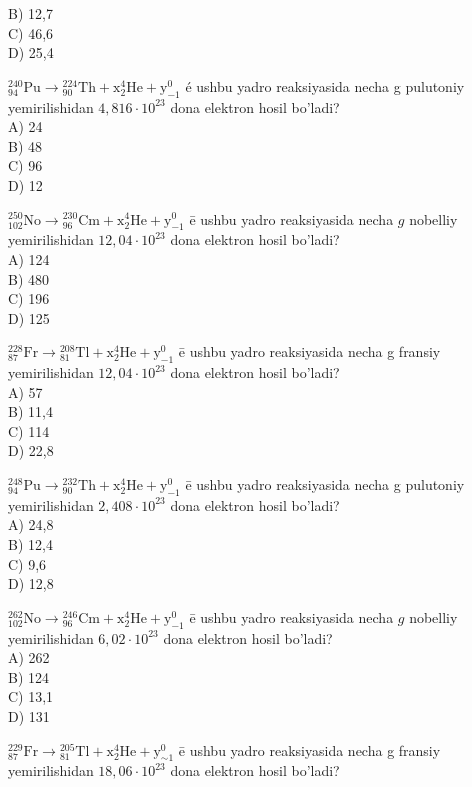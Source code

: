 B) 12,7\\
C) 46,6\\
D) 25,4
  \item ${ }_{94}^{240} \mathrm{Pu} \rightarrow{ }_{90}^{224} \mathrm{Th}+\mathrm{x}_{2}^{4} \mathrm{He}+\mathrm{y}_{-1}^{0}$ é ushbu yadro reaksiyasida necha g pulutoniy yemirilishidan $4,816 \cdot 10^{23}$ dona elektron hosil bo'ladi?\\
A) 24\\
B) 48\\
C) 96\\
D) 12
  \item ${ }_{102}^{250} \mathrm{No} \rightarrow{ }_{96}^{230} \mathrm{Cm}+\mathrm{x}_{2}^{4} \mathrm{He}+\mathrm{y}_{-1}^{0}$ ē ushbu yadro reaksiyasida necha $g$ nobelliy yemirilishidan $12,04 \cdot 10^{23}$ dona elektron hosil bo'ladi?\\
A) 124\\
B) 480\\
C) 196\\
D) 125
  \item ${ }_{87}^{228} \mathrm{Fr} \rightarrow{ }_{81}^{208} \mathrm{Tl}+\mathrm{x}_{2}^{4} \mathrm{He}+\mathrm{y}_{-1}^{0}$ ē ushbu yadro reaksiyasida necha g fransiy yemirilishidan $12,04 \cdot 10^{23}$ dona elektron hosil bo'ladi?\\
A) 57\\
B) 11,4\\
C) 114\\
D) 22,8
  \item ${ }_{94}^{248} \mathrm{Pu} \rightarrow{ }_{90}^{232} \mathrm{Th}+\mathrm{x}_{2}^{4} \mathrm{He}+\mathrm{y}_{-1}^{0}$ ē ushbu yadro reaksiyasida necha g pulutoniy yemirilishidan $2,408 \cdot 10^{23}$ dona elektron hosil bo'ladi?\\
A) 24,8\\
B) 12,4\\
C) 9,6\\
D) 12,8
  \item ${ }_{102}^{262} \mathrm{No} \rightarrow{ }_{96}^{246} \mathrm{Cm}+\mathrm{x}_{2}^{4} \mathrm{He}+\mathrm{y}_{-1}^{0}$ ē ushbu yadro reaksiyasida necha $g$ nobelliy yemirilishidan $6,02 \cdot 10^{23}$ dona elektron hosil bo'ladi?\\
A) 262\\
B) 124\\
C) 13,1\\
D) 131
  \item ${ }_{87}^{229} \mathrm{Fr} \rightarrow{ }_{81}^{205} \mathrm{Tl}+\mathrm{x}_{2}^{4} \mathrm{He}+\mathrm{y}_{\sim 1}^{0}$ ē ushbu yadro reaksiyasida necha g fransiy yemirilishidan $18,06 \cdot 10^{23}$ dona elektron hosil bo'ladi?\\
